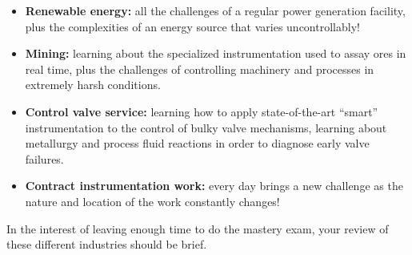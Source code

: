 \begin{itemize}
\item{} {\bf Renewable energy:} all the challenges of a regular power generation facility, plus the complexities of an energy source that varies uncontrollably!
\item{} {\bf Mining:} learning about the specialized instrumentation used to assay ores in real time, plus the challenges of controlling machinery and processes in extremely harsh conditions.
\item{} {\bf Control valve service:} learning how to apply state-of-the-art ``smart'' instrumentation to the control of bulky valve mechanisms, learning about metallurgy and process fluid reactions in order to diagnose early valve failures.  
\item{} {\bf Contract instrumentation work:} every day brings a new challenge as the nature and location of the work constantly changes!
\end{itemize}

In the interest of leaving enough time to do the mastery exam, your review of these different industries should be brief.




